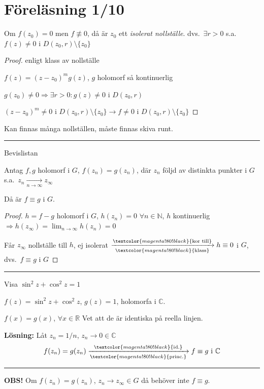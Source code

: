 \section{Föreläsning 1/10}

\begin{theorem}[Kollarium]
Om $f(z_0) = 0$ men $f \not\equiv 0$, då är $z_0$ ett \emph{isolerat nollställe}. dvs.\ $\exists r > 0$ s.a.\ $f(z) \neq 0$ i $D(z_0, r) \setminus \{z_0\}$
\end{theorem}
\begin{proof}
enligt klass av nollställe

$f(z) = (z - z_0)^m g(z)$, $g$ holomorf så kontinuerlig

$g(z_0) \neq 0 \Rightarrow \exists r > 0 : g(z) \neq 0$ i $D(z_0, r)$

$(z - z_0)^m \neq 0$ i $D(z_0, r) \setminus \{z_0\} \to f \neq 0$ i $D(z_0, r) \setminus \{z_0\}$
\end{proof}
\textcolor{magenta!80!black}{Kan finnas många nollställen, måste finnas skiva runt.}

\noindent\rule{\linewidth}{0.4pt}

\begin{theorem}[Identitetsprincipen]
\hfill \textcolor{magenta!80!black}{Bevislistan}

Antag $f, g$ holomorf i $G$, $f(z_n) = g(z_n)$, där $z_n$ följd av distinkta punkter i $G$ s.a.\ $z_n \xrightarrow[n \to \infty]{} z_\infty$

Då är $f \equiv g$ i $G$.
\end{theorem}
\begin{proof}
$h = f - g$ holomorf i $G$, $h(z_n) = 0$ $\forall n \in \mathbb{N}$, $h$ kontinuerlig $\Rightarrow h(z_\infty) = \displaystyle\lim_{n \to \infty} h(z_n) = 0$

Får $z_\infty$ nollställe till $h$, ej isolerat $\xrightarrow[\textcolor{magenta!80!black}{\text{klass}}]{\textcolor{magenta!80!black}{\text{kor till}}} h \equiv 0$ i $G$, dvs.\ $f \equiv g$ i $G$
\end{proof}

\noindent\rule{\linewidth}{0.4pt}

\begin{example}
Visa $\sin^2 z + \cos^2 z = 1$

$f(z) = \sin^2 z + \cos^2 z$, $g(z) = 1$, holomorfa i $\mathbb{C}$.

$f(x) = g(x)$, $\forall x \in \mathbb{R}$ \quad \textcolor{magenta!80!black}{Vet att de är identiska på reella linjen.}

\textbf{Lösning:} Låt $z_n = 1/n$, $z_n \to 0 \in \mathbb{C}$
\[ f(z_n) = g(z_n) \xrightarrow[\textcolor{magenta!80!black}{\text{princ.}}]{\textcolor{magenta!80!black}{\text{id.}}} f \equiv g \text{ i } \mathbb{C} \]
\end{example}

\noindent\rule{\linewidth}{0.4pt}

\textcolor{red!70!black}{\textbf{OBS!}} Om $f(z_n) = g(z_n)$, $z_n \to z_\infty \in G$ då behöver inte $f \equiv g$.
